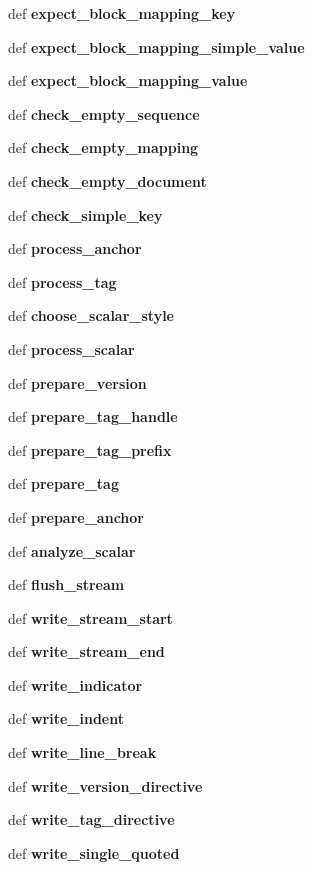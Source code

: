 \begin{CompactItemize}
def {\bf expect\_\-block\_\-mapping\_\-key}
\item 
def {\bf expect\_\-block\_\-mapping\_\-simple\_\-value}
\item 
def {\bf expect\_\-block\_\-mapping\_\-value}
\item 
def {\bf check\_\-empty\_\-sequence}
\item 
def {\bf check\_\-empty\_\-mapping}
\item 
def {\bf check\_\-empty\_\-document}
\item 
def {\bf check\_\-simple\_\-key}
\item 
def {\bf process\_\-anchor}
\item 
def {\bf process\_\-tag}
\item 
def {\bf choose\_\-scalar\_\-style}
\item 
def {\bf process\_\-scalar}
\item 
def {\bf prepare\_\-version}
\item 
def {\bf prepare\_\-tag\_\-handle}
\item 
def {\bf prepare\_\-tag\_\-prefix}
\item 
def {\bf prepare\_\-tag}
\item 
def {\bf prepare\_\-anchor}
\item 
def {\bf analyze\_\-scalar}
\item 
def {\bf flush\_\-stream}
\item 
def {\bf write\_\-stream\_\-start}
\item 
def {\bf write\_\-stream\_\-end}
\item 
def {\bf write\_\-indicator}
\item 
def {\bf write\_\-indent}
\item 
def {\bf write\_\-line\_\-break}
\item 
def {\bf write\_\-version\_\-directive}
\item 
def {\bf write\_\-tag\_\-directive}
\item 
def {\bf write\_\-single\_\-quoted}
\end{CompactItemize}
